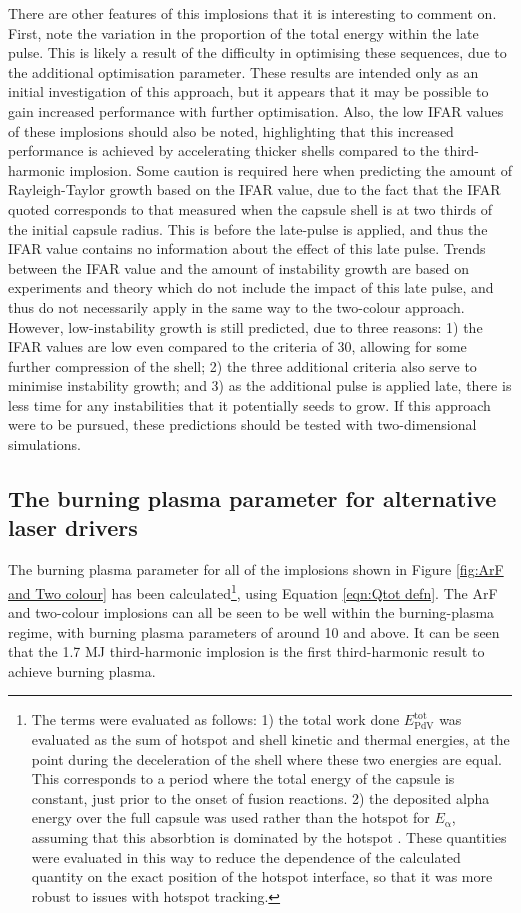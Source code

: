 There are other features of this implosions that it is interesting to comment on. First, note the variation in the proportion of the total energy within the late pulse. This is likely a result of the difficulty in optimising these sequences, due to the additional optimisation parameter. These results are intended only as an initial investigation of this approach, but it appears that it may be possible to gain increased performance with further optimisation. Also, the low IFAR values of these implosions should also be noted, highlighting that this increased performance is achieved by accelerating thicker shells compared to the third-harmonic implosion. Some caution is required here when predicting the amount of Rayleigh-Taylor growth based on the IFAR value, due to the fact that the IFAR quoted corresponds to that measured when the capsule shell is at two thirds of the initial capsule radius. This is before the late-pulse is applied, and thus the IFAR value contains no information about the effect of this late pulse. Trends between the IFAR value and the amount of instability growth are based on experiments and theory which do not include the impact of this late pulse, and thus do not necessarily apply in the same way to the two-colour approach. However, low-instability growth is still predicted, due to three reasons: 1) the IFAR values are low even compared to the criteria of 30, allowing for some further compression of the shell; 2) the three additional criteria also serve to minimise instability growth; and 3) as the additional pulse is applied late, there is less time for any instabilities that it potentially seeds to grow. If this approach were to be pursued, these predictions should be tested with two-dimensional simulations.

\subsection{The burning plasma parameter for alternative laser drivers}

The burning plasma parameter for all of the implosions shown in Figure \ref{fig:ArF and Two colour} has been calculated\footnote{The terms were evaluated as follows: 1) the total work done $E^\mathrm{{tot}}_{\mathrm{PdV}}$ was evaluated as the sum of hotspot and shell kinetic and thermal energies, at the point during the deceleration of the shell where these two energies are equal. This corresponds to a period where the total energy of the capsule is constant, just prior to the onset of fusion reactions. 2) the deposited alpha energy over the full capsule was used rather than the hotspot for $E_\mathrm{\alpha}$, assuming that this absorbtion is dominated by the hotspot \cite{Christopherson2018}. These quantities were evaluated in this way to reduce the dependence of the calculated quantity on the exact position of the hotspot interface, so that it was more robust to issues with hotspot tracking.}, using Equation \ref{eqn:Qtot defn}. The ArF and two-colour implosions can all be seen to be well within the burning-plasma regime, with burning plasma parameters of around 10 and above. It can be seen that the 1.7 MJ third-harmonic implosion is the first third-harmonic result to achieve burning plasma.

